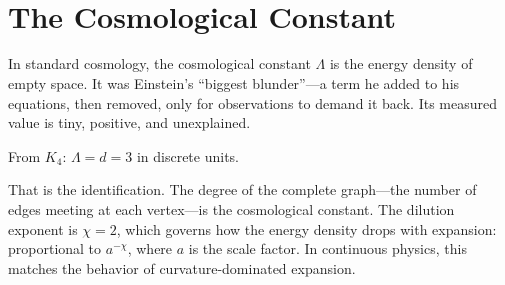 \documentclass[11pt,a4paper]{book}
\begin{document}
\begin{code}%
\>[0]\<%
\\
%
\\[\AgdaEmptyExtraSkip]%
\>[0]\AgdaSpace{}%
\AgdaSymbol{:}\AgdaSpace{}%
\<%
\\
\>[0]\AgdaSpace{}%
\AgdaSymbol{=}\AgdaSpace{}%
\<%
\\
%
\\[\AgdaEmptyExtraSkip]%
\>[0]\AgdaSpace{}%
\AgdaSymbol{:}\AgdaSpace{}%
\<%
\\
\>[0]\AgdaSpace{}%
\AgdaSymbol{=}\AgdaSpace{}%
\<%
\\
%
\\[\AgdaEmptyExtraSkip]%
\>[0]\AgdaSpace{}%
\AgdaSymbol{:}\AgdaSpace{}%
\AgdaSpace{}%
\AgdaSpace{}%
\<%
\\
\>[0]\AgdaSpace{}%
\AgdaSymbol{=}\AgdaSpace{}%
\<%
\end{code}

\chapter{The Cosmological Constant}
\label{ch:cosmological-constant}

In standard cosmology, the cosmological constant $\Lambda$ is the energy density of empty space. It was Einstein's ``biggest blunder''---a term he added to his equations, then removed, only for observations to demand it back. Its measured value is tiny, positive, and unexplained.

From $K_4$: $\Lambda = d = 3$ in discrete units.

That is the identification. The degree of the complete graph---the number of edges meeting at each vertex---is the cosmological constant. The dilution exponent is $\chi = 2$, which governs how the energy density drops with expansion: proportional to $a^{-\chi}$, where $a$ is the scale factor. In continuous physics, this matches the behavior of curvature-dominated expansion.
\end{document}
